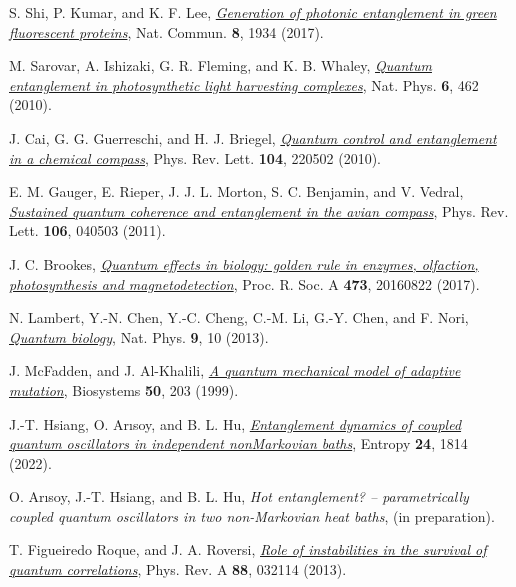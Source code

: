 \documentclass[11pt,a4paper]{article}
\begin{document}
\begin{thebibliography}{99}
    S. Shi, P. Kumar, and K. F. Lee, \href{https://doi.org/10.1038/s41467-017-02027-9}{\textit{Generation of photonic entanglement in green fluorescent proteins}}, Nat. Commun. \textbf{8}, 1934 (2017).

    M. Sarovar, A. Ishizaki, G. R. Fleming, and K. B. Whaley, \href{https://doi.org/10.1038/nphys1652}{\textit{Quantum entanglement in photosynthetic light harvesting complexes}}, Nat. Phys. \textbf{6}, 462 (2010).

    J. Cai, G. G. Guerreschi, and H. J. Briegel, \href{https://doi.org/10.1103/PhysRevLett.104.220502}{\textit{Quantum control and entanglement in a chemical compass}}, Phys. Rev. Lett. \textbf{104}, 220502 (2010).

    E. M. Gauger, E. Rieper, J. J. L. Morton, S. C. Benjamin, and V. Vedral, \href{https://doi.org/10.1103/PhysRevLett.106.040503}{\textit{Sustained quantum coherence and entanglement in the avian compass}}, Phys. Rev. Lett. \textbf{106}, 040503 (2011).

    J. C. Brookes, \href{https://doi.org/10.1098/rspa.2016.0822}{\textit{Quantum effects in biology: golden rule in enzymes, olfaction, photosynthesis and magnetodetection}}, Proc. R. Soc. A \textbf{473}, 20160822 (2017).

    N. Lambert, Y.-N. Chen, Y.-C. Cheng, C.-M. Li, G.-Y. Chen, and F. Nori, \href{https://doi.org/10.1038/nphys2474}{\textit{Quantum biology}}, Nat. Phys. \textbf{9}, 10 (2013).

    J. McFadden, and J. Al-Khalili, \href{https://doi.org/10.1016/S0303-2647(99)00004-0}{\textit{A quantum mechanical model of adaptive mutation}}, Biosystems \textbf{50}, 203 (1999).

    J.-T. Hsiang, O. Ar{\i}soy, and B. L. Hu, \href{https://doi.org/10.3390/e24121814}{\textit{Entanglement dynamics of coupled quantum oscillators in independent nonMarkovian baths}}, Entropy \textbf{24}, 1814 (2022).

    O. Ar{\i}soy, J.-T. Hsiang, and B. L. Hu, \textit{Hot entanglement? -- parametrically coupled quantum oscillators in two non-Markovian heat baths}, (in preparation).      

    T. Figueiredo Roque, and J. A. Roversi, \href{https://doi.org/10.1103/PhysRevA.88.032114}{\textit{Role of instabilities in the survival of quantum correlations}}, Phys. Rev. A \textbf{88}, 032114 (2013).


\end{thebibliography}
\end{document}
